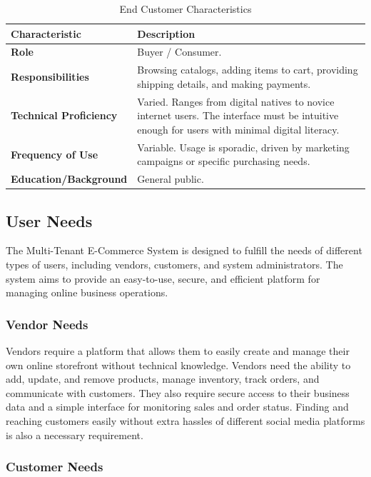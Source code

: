 \begin{table}[H]
\centering
\begin{tabular}{|p{4.5cm}|p{10cm}|}
\hline
\textbf{Characteristic} & \textbf{Description} \\
\hline
\textbf{Role} & Buyer / Consumer. \\
\hline
\textbf{Responsibilities} & Browsing catalogs, adding items to cart, providing shipping details, and making payments. \\
\hline
\textbf{Technical Proficiency} & Varied. Ranges from digital natives to novice internet users. The interface must be intuitive enough for users with minimal digital literacy. \\
\hline
\textbf{Frequency of Use} & Variable. Usage is sporadic, driven by marketing campaigns or specific purchasing needs. \\
\hline
\textbf{Education/Background} & General public. \\
\hline
\end{tabular}
\caption{End Customer Characteristics}
\label{tab:end-customer}
\end{table}

\subsection{User Needs}
\label{subsec:user-needs}

The Multi-Tenant E-Commerce System is designed to fulfill the needs of different types of users, including vendors, customers, and system administrators. The system aims to provide an easy-to-use, secure, and efficient platform for managing online business operations.

\subsubsection{Vendor Needs}
\label{subsec:vendor-needs}

Vendors require a platform that allows them to easily create and manage their own online storefront without technical knowledge. Vendors need the ability to add, update, and remove products, manage inventory, track orders, and communicate with customers. They also require secure access to their business data and a simple interface for monitoring sales and order status. Finding and reaching customers easily without extra hassles of different social media platforms is also a necessary requirement.

\subsubsection{Customer Needs}
\label{subsec:customer-needs}

